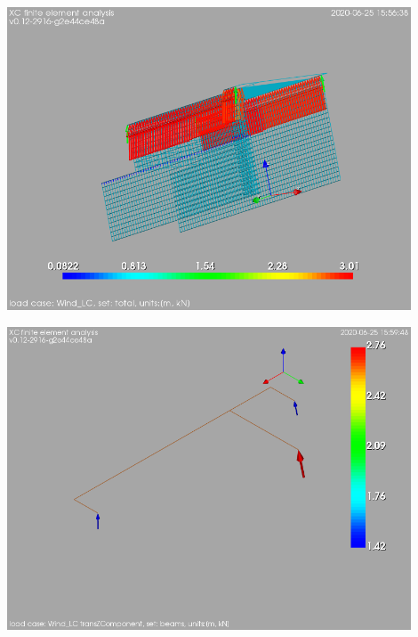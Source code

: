 \begin{Figure}
    \centering
    \includegraphics[width=120mm]{ramp_wall/figures/wind_load_over_ramp_wall}
\end{Figure}

\begin{Figure}
    \centering
    \includegraphics[width=120mm]{ramp_wall/figures/wind_load_over_steel_beams}
    \label{rw_W}
\end{Figure}

